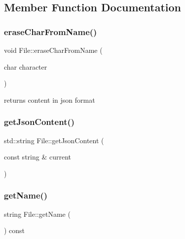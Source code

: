 \subsection{Member Function Documentation}
\mbox{\label{class_file_aef2ef41308caf6124548ed6421b91188}} 
\subsubsection{\texorpdfstring{erase\+Char\+From\+Name()}{eraseCharFromName()}}
{\footnotesize\ttfamily void File\+::erase\+Char\+From\+Name (\begin{DoxyParamCaption}\item[{char}]{character }\end{DoxyParamCaption})\hspace{0.3cm}{\ttfamily [inline]}}



returns content in json format 

\mbox{\label{class_file_afaee512326a13dc99d6b8d08522eabe8}} 
\subsubsection{\texorpdfstring{get\+Json\+Content()}{getJsonContent()}}
{\footnotesize\ttfamily std\+::string File\+::get\+Json\+Content (\begin{DoxyParamCaption}\item[{const string \&}]{current }\end{DoxyParamCaption})}

\mbox{\label{class_file_a4b6032847dfd076db8ed44a532387f07}} 
\subsubsection{\texorpdfstring{get\+Name()}{getName()}}
{\footnotesize\ttfamily string File\+::get\+Name (\begin{DoxyParamCaption}{ }\end{DoxyParamCaption}) const\hspace{0.3cm}{\ttfamily [inline]}}

